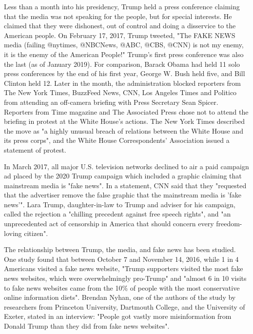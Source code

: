 Less than a month into his presidency, Trump held a press conference
claiming that the media was not speaking for the people, but for special
interests. He claimed that they were dishonest, out of control and doing
a disservice to the American people. On February 17, 2017, Trump
tweeted, "The FAKE NEWS media (failing @nytimes, @NBCNews, @ABC, @CBS,
@CNN) is not my enemy, it is the enemy of the American People!" Trump's
first press conference was also the last (as of January 2019). For
comparison, Barack Obama had held 11 solo press conferences by the end
of his first year, George W. Bush held five, and Bill Clinton held 12.
Later in the month, the administration blocked reporters from The New
York Times, BuzzFeed News, CNN, Los Angeles Times and Politico from
attending an off-camera briefing with Press Secretary Sean Spicer.
Reporters from Time magazine and The Associated Press chose not to
attend the briefing in protest at the White House's actions. The New
York Times described the move as "a highly unusual breach of relations
between the White House and its press corps", and the White House
Correspondents' Association issued a statement of protest.

In March 2017, all major U.S. television networks declined to air a paid
campaign ad placed by the 2020 Trump campaign which included a graphic
claiming that mainstream media is "fake news". In a statement, CNN said
that they "requested that the advertiser remove the false graphic that
the mainstream media is 'fake news'". Lara Trump, daughter-in-law to
Trump and adviser for his campaign, called the rejection a "chilling
precedent against free speech rights", and "an unprecedented act of
censorship in America that should concern every freedom-loving citizen".

The relationship between Trump, the media, and fake news has been
studied. One study found that between October 7 and November 14, 2016,
while 1 in 4 Americans visited a fake news website, "Trump supporters
visited the most fake news websites, which were overwhelmingly
pro-Trump" and "almost 6 in 10 visits to fake news websites came from
the 10\% of people with the most conservative online information diets".
Brendan Nyhan, one of the authors of the study by researchers from
Princeton University, Dartmouth College, and the University of Exeter,
stated in an interview: "People got vastly more misinformation from
Donald Trump than they did from fake news websites".

